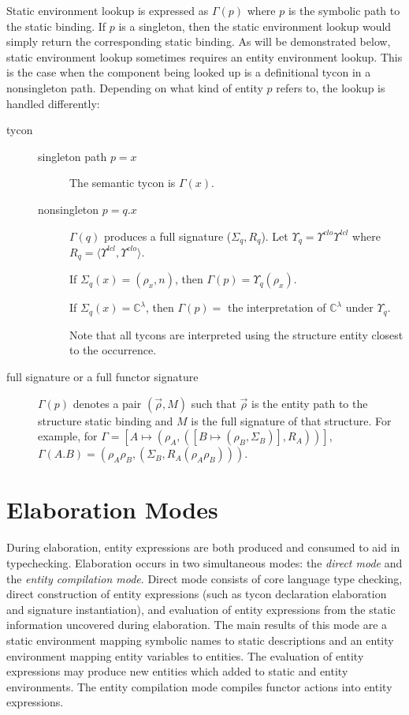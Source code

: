 Static environment lookup is expressed as $\Gamma(p)$ where $p$ is the symbolic path to the static binding. If $p$ is a singleton, then the static environment lookup would simply return the corresponding static binding. As will be demonstrated below, static environment lookup sometimes requires an entity environment lookup. This is the case when the component being looked up is a definitional tycon in a nonsingleton path. Depending on what kind of entity $p$ refers to, the lookup is handled differently:
\begin{description}
\item[tycon]
\begin{description}
\item[singleton path $p=x$] The semantic tycon is $\Gamma(x)$.
\item[nonsingleton $p=q.x$] $\Gamma(q)$ produces a full signature ($\Sigma_q,R_q$). Let $\Upsilon_q = \Upsilon^{clo}\Upsilon^{lcl}$ where $R_q = \langle \Upsilon^{lcl}, \Upsilon^{clo}\rangle$. 

If $\Sigma_q(x) = (\rho_x,n)$, then $\Gamma(p) = \Upsilon_q(\rho_x)$. 

If $\Sigma_q(x) = \mathbb{C}^\lambda$, then $\Gamma(p) = $ the interpretation of $\mathbb{C}^\lambda$ under $\Upsilon_q$. 

Note that all tycons are interpreted using the structure entity closest to the occurrence. 
\end{description}
\item[full signature or a full functor signature] $\Gamma(p)$ denotes a pair $(\vec{\rho}, M)$ such that $\vec{\rho}$ is the entity path to the structure static binding and $M$ is the full signature of that structure. For example, for $\Gamma=[A\mapsto(\rho_A,([B\mapsto(\rho_B, \Sigma_B)], R_A))]$, $\Gamma(A.B) = (\rho_A\rho_B, (\Sigma_B,R_A(\rho_A\rho_B)))$. 
\end{description}

\section{Elaboration Modes}
During elaboration, entity expressions are both produced and consumed to aid in typechecking. Elaboration occurs in two simultaneous modes: the \emph{direct mode} and the \emph{entity compilation mode}. Direct mode consists of core language type checking, direct construction of entity expressions (such as tycon declaration elaboration and signature instantiation), and evaluation of entity expressions from the static information uncovered during elaboration. The main results of this mode are a static environment mapping symbolic names to static descriptions and an entity environment mapping entity variables to entities. The evaluation of entity expressions may produce new entities which added to static and entity environments. The entity compilation mode compiles functor actions into entity expressions.   

